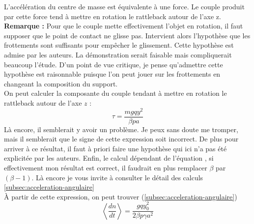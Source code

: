 \documentclass[12pt,a4paper]{article}
\makeatletter
\renewcommand*{\eqref}[1]{%
	\hyperref[{#1}]{\textup{\tagform@{\ref*{#1}}}}%
}
\makeatother
\begin{document}
	L'accélération du centre de masse est équivalente à une force.
	Le couple produit par cette force tend à mettre en rotation le rattleback autour de l'axe z.\\
	
	\textbf{Remarque : }Pour que le couple mette effectivement l'objet en rotation, il faut supposer que le point de contact ne glisse pas. Intervient alors l'hypothèse que les frottements sont suffisants pour empêcher le glissement. Cette hypothèse est admise par les auteurs. La démonstration serait faisable mais compliquerait beaucoup l'étude. D'un point de vue critique, je pense qu'admettre cette hypothèse est raisonnable puisque l'on peut jouer sur les frottements en changeant la composition du support.
	\\
	

	On peut calculer la composante du couple tendant à mettre en rotation le rattleback autour de l'axe $z$ :
	$$\tau=\dfrac{mgqy^2}{\beta p a}$$
 	Là encore, il semblerait y avoir un problème. Je peux sans doute me tromper, mais il semblerait que le signe de cette expression soit incorrect. De plus pour arriver à ce résultat, il faut à priori faire une hypothèse qui ici n'a pas été explicitée par les auteurs. Enfin, le calcul dépendant de l'équation \eqref{eq:acc-cm}, si effectivement mon résultat est correct, il faudrait en plus remplacer $\beta$ par $(\beta-1)$. Là encore je vous invite à consulter le détail des calculs \autoref{subsec:acceleration-angulaire}\\
	À partir de cette expression, on peut trouver (\ref{subsec:acceleration-angulaire})
	\begin{equation}
		\left<\dfrac{dn}{dt}\right>=\dfrac{gqy_0^2}{2\beta p\gamma a^2}
	\end{equation}
	
\end{document}
